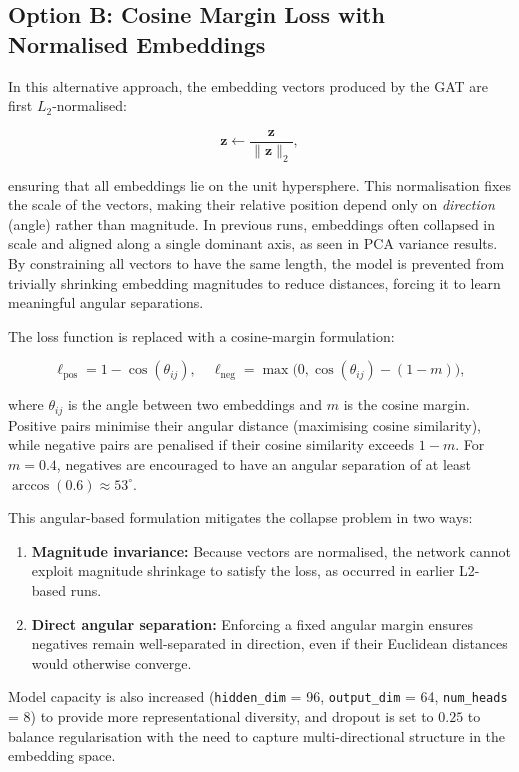 \subsection{Option B: Cosine Margin Loss with Normalised Embeddings}

In this alternative approach, the embedding vectors produced by the GAT are
first $L_{2}$-normalised:

\[
\mathbf{z} \leftarrow \frac{\mathbf{z}}{\lVert \mathbf{z} \rVert_2},
\]

ensuring that all embeddings lie on the unit hypersphere. This normalisation
fixes the scale of the vectors, making their relative position depend only on
\emph{direction} (angle) rather than magnitude. In previous runs, embeddings
often collapsed in scale and aligned along a single dominant axis, as seen in
PCA variance results. By constraining all vectors to have the same length, the
model is prevented from trivially shrinking embedding magnitudes to reduce
distances, forcing it to learn meaningful angular separations.

The loss function is replaced with a cosine-margin formulation:

\[
\ell_{\text{pos}} = 1 - \cos(\theta_{ij}), \quad
\ell_{\text{neg}} = \max\big(0, \cos(\theta_{ij}) - (1 - m)\big),
\]

where $\theta_{ij}$ is the angle between two embeddings and $m$ is the cosine
margin. Positive pairs minimise their angular distance (maximising cosine
similarity), while negative pairs are penalised if their cosine similarity
exceeds $1 - m$. For $m = 0.4$, negatives are encouraged to have an angular
separation of at least $\arccos(0.6) \approx 53^\circ$.

This angular-based formulation mitigates the collapse problem in two ways:
\begin{enumerate}
    \item \textbf{Magnitude invariance:} Because vectors are normalised, the network cannot exploit magnitude shrinkage to satisfy the loss, as occurred in earlier L2-based runs.
    \item \textbf{Direct angular separation:} Enforcing a fixed angular margin ensures negatives remain well-separated in direction, even if their Euclidean distances would otherwise converge.
\end{enumerate}

Model capacity is also increased (\texttt{hidden\_dim} = 96, \texttt{output\_dim} = 64, \texttt{num\_heads} = 8) to provide more representational diversity, and dropout is set to $0.25$ to balance regularisation with the need to capture multi-directional structure in the embedding space.

